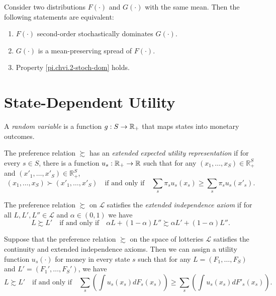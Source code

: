 \begin{prop}
    Consider two distributions $F(\cdot)$ and $G(\cdot)$ with the same mean. Then the following statements are equivalent:
    \begin{enumerate}
        \item $F(\cdot)$ second-order stochastically dominates $G(\cdot)$.
        \item $G(\cdot)$ is a mean-preserving spread of $F(\cdot)$.
        \item Property \ref{pi.chvi.2-stoch-dom} holds.
    \end{enumerate}
\end{prop}


\section{State-Dependent Utility}

\begin{defn}
    A \emph{random variable} is a function $g : S \rightarrow \mathbb{R}_+$ that maps states into monetary outcomes.
\end{defn}

\begin{defn}
    The preference relation $\succsim$ has an \emph{extended expected utility representation} if for every $s \in S$, there is a function $u_s : \mathbb{R}_+ \rightarrow \mathbb{R}$ such that for any $(x_1, \dots, x_S) \in \mathbb{R}^{S}_+$ and $(x'_1, \dots, x'_S) \in \mathbb{R}^{S}_+$,
    \begin{equation*}
        (x_1, \dots, x_S) \succ (x'_1, \dots, x'_S) \quad \text{if and only if} \quad \sum_s \pi_s u_s(x_s) \geq \sum_s \pi_s u_s(x'_s).
    \end{equation*}
\end{defn}

\begin{defn}
    The preference relation $\succsim$ on $\mathscr{L}$ satisfies the \emph{extended independence axiom} if for all $L, L', L'' \in \mathscr{L}$ and $\alpha \in (0, 1)$ we have
    \begin{equation*}
        L \succsim L' \quad \text{if and only if} \quad \alpha L + (1 - \alpha) L'' \succsim \alpha L' + (1 - \alpha) L''.
    \end{equation*}
\end{defn}

\begin{prop}
    Suppose that the preference relation $\succsim$ on the space of lotteries $\mathscr{L}$ satisfies the continuity and extended independence axioms. Then we can assign a utility function $u_s(\cdot)$ for money in every state $s$ such that for any $L = (F_1, \dots, F_S)$ and $L' = (F_1', \dots, F_S')$, we have
    \begin{equation*}
        L \succsim L' \quad \text{if and only if} \quad \sum_s \left(\int u_s(x_s)dF_s(x_s) \right) \geq \sum_s \left(\int u_s(x_s)dF'_s(x_s) \right).
    \end{equation*}
\end{prop}

